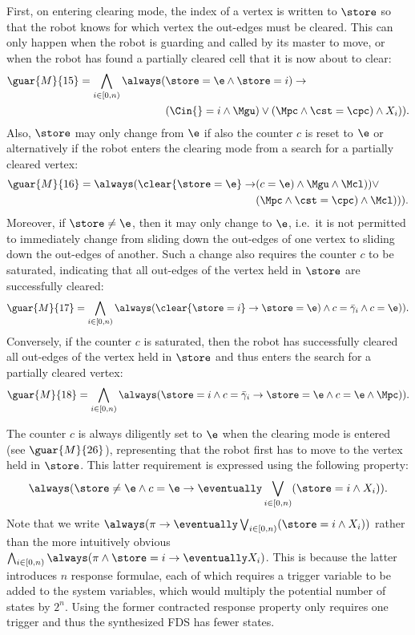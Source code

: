 First, on entering clearing mode, the index of a vertex is written to $\store$ so that the robot knows for which vertex the out-edges must be cleared. This can only happen when the robot is guarding and called by its master to move, or when the robot has found a partially cleared cell that it is now about to clear:
\begin{align*}
	\guar{M}{15} = \bigwedge_{i \in [0, n)}\always(&\store=\e \wedge \next(\store=i) \rightarrow \\ &(\Cin{}=i \wedge \Mgu) \vee (\Mpc \wedge \next(\cst=\cpc) \wedge X_i)).
\end{align*}
Also, $\store$ may only change from $\e$ if also the counter $c$ is reset to $\e$ or alternatively if the robot enters the clearing mode from a search for a partially cleared vertex:
\begin{align*}
	\guar{M}{16} = \always(\clear{\store=\e} \rightarrow &(\next(c=\e)\wedge \Mgu \wedge\next(\Mcl)) \vee \\ &(\Mpc \wedge\next(\cst=\cpc) \wedge\next(\Mcl))).
\end{align*}
Moreover, if $\store\neq\e$, then it may only change to $\e$, i.e.\ it is not permitted to immediately change from sliding down the out-edges of one vertex to sliding down the out-edges of another. Such a change also requires the counter $c$ to be saturated, indicating that all out-edges of the vertex held in $\store$ are successfully cleared:
\begin{equation*}
	\guar{M}{17} = \bigwedge_{i \in [0, n)}\always(\clear{\store=i} \rightarrow \next(\store=\e) \wedge c=\bar{\gamma}_i \wedge \next(c=\e)).
\end{equation*}
Conversely, if the counter $c$ is saturated, then the robot has successfully cleared all out-edges of the vertex held in $\store$ and thus enters the search for a partially cleared vertex:
\begin{equation*}
	\guar{M}{18} = \bigwedge_{i \in [0, n)}\always(\store=i \wedge c=\bar{\gamma}_i \rightarrow \next(\store=\e \wedge c=\e \wedge \Mpc)).
\end{equation*}

The counter $c$ is always diligently set to $\e$ when the clearing mode is entered (see $\guar{M}{26}$), representing that the robot first has to move to the vertex held in $\store$. This latter requirement is expressed using the following property:
\begin{equation}
	\always(\store\neq\e\wedge c=\e \rightarrow \eventually \bigvee_{i \in [0, n)}(\store=i\wedge X_i)).
	\label{eq:gohome}
\end{equation}
Note that we write $\always(\pi \rightarrow \eventually\bigvee_{i \in [0,n)}(\store=i\wedge X_i))$ rather than the more intuitively obvious $\bigwedge_{i \in [0,n)}\always(\pi \wedge \store=i \rightarrow \eventually X_i)$. This is because the latter introduces $n$ response formulae, each of which requires a trigger variable to be added to the system variables, which would multiply the potential number of states by $2^n$. Using the former contracted response property only requires one trigger and thus the synthesized FDS has fewer states.\\

